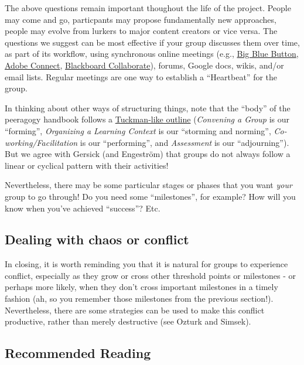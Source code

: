 The above questions remain important thoughout the life of the project.
People may come and go, particpants may propose fundamentally new
approaches, people may evolve from lurkers to major content creators or
vice versa. The questions we suggest can be most effective if your group
discusses them over time, as part of its workflow, using synchronous
online meetings (e.g., \href{http://www.bigbluebutton.org/}{Big Blue
Button},
\href{http://success.adobe.com/en/na/sem/products/connect/1109\_6011\_connect\_webinars.html?sdid=IEASO\&skwcid=TC\textbar{}22191\textbar{}adobe\%20connect\textbar{}\textbar{}S\textbar{}e\textbar{}5894715262}{Adobe
Connect},
\href{http://www.blackboard.com/platforms/collaborate/overview.aspx}{Blackboard
Collaborate}), forums, Google docs, wikis, and/or email lists. Regular
meetings are one way to establish a ``Heartbeat'' for the group.

In thinking about other ways of structuring things, note that the
``body'' of the peeragogy handbook follows a
\href{http://en.wikipedia.org/wiki/Forming-storming-norming-performing}{Tuckman-like
outline} (\emph{Convening a Group} is our ``forming'', \emph{Organizing
a Learning Context} is our ``storming and norming'',
\emph{Co-working/Facilitation} is our ``performing'', and
\emph{Assessment} is our ``adjourning''). But we agree with Gersick (and
Engeström) that groups do not always follow a linear or cyclical pattern
with their activities!

Nevertheless, there may be some particular stages or phases that you
want \emph{your} group to go through! Do you need some ``milestones'',
for example? How will you know when you've achieved ``success''? Etc.

\subsection{Dealing with chaos or conflict}

In closing, it is worth reminding you that it is natural for groups to
experience conflict, especially as they grow or cross other threshold
points or milestones - or perhaps more likely, when they don't cross
important milestones in a timely fashion (ah, so you remember those
milestones from the previous section!). Nevertheless, there are some
strategies can be used to make this conflict productive, rather than
merely destructive (see Ozturk and Simsek).

\subsection{Recommended Reading}

